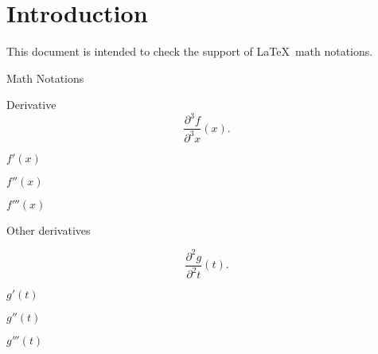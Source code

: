 \documentclass{article}
\newcommand{\derivative}[3]{\frac{\partial^{#3} #1}{\partial^{#3} #2}(#2)}
\begin{document}
\section*{Introduction}

This document is intended to check the support of \LaTeX\ math notations.

\begin{quiz}{Math Notations}

\begin{multi}{Derivative}
\[\derivative{f}{x}{3}.\]
\item $f'(x)$
\item $f''(x)$
\item* $f'''(x)$
\end{multi}

\begin{cloze}{Other derivatives}
\begin{multi}[vertical]
\[\derivative{g}{t}{2}.\]
\item $g'(t)$
\item* $g''(t)$
\item $g'''(t)$
\end{multi}
\end{cloze}

\end{quiz}
\end{document}
